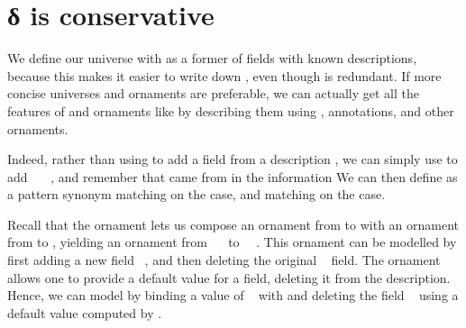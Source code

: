 \section{δ is conservative}\label{sec:redundant-delta}
We define our universe  with  as a former of fields with known descriptions, because this makes it easier to write down , even though  is redundant. If more concise universes and ornaments are preferable, we can actually get all the features of  and ornaments like  by describing them using , annotations, and other ornaments.

Indeed, rather than using  to add a field from a description , we can simply use  to add \ \AV{=}\ \ , and remember that  came from  in the information
We can then define  as a pattern synonym matching on the  case, and  matching on the  case.

Recall that the ornament  lets us compose an ornament from  to  with an ornament from  to , yielding an ornament from \ \  to \ \ . This ornament can be modelled by first adding a new field \ , and then deleting the original \  field. The ornament  \cite{kophd} allows one to provide a default value for a field, deleting it from the description. Hence, we can model  by binding a value  of \  with  and deleting the field \  using a default value computed by .





